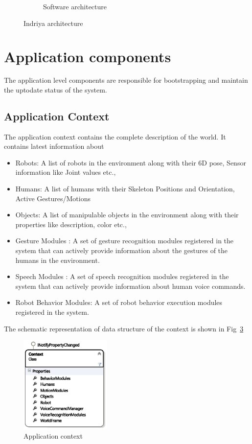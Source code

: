\begin{figure}
\begin{subfigure}[t]{0.44\textwidth}
\caption[Software architecture]{Software architecture}
\label{fig:architecture}
\end{subfigure}
\caption[Indriya architecture]{Indriya architecture}
\label{fig:indriya_arch}
\end{figure}
\section{Application components}
\label{ssec:app_comp}
The application level components are responsible for bootstrapping and maintain the uptodate status of the system. 
\subsection*{Application Context}
The application context contains the complete description of the world. It contains latest information about
\begin{itemize}[leftmargin={1cm},topsep={0pt},itemsep={0pt},partopsep={0pt},parsep={0pt}] 
\item Robots: A list of robots in the environment along with their 6D pose, Sensor information like Joint values etc.,
\item Humans: A list of humans with their Skeleton Positions and Orientation, Active Gestures/Motions
\item Objects: A list of manipulable objects in the environment along with their properties like description, color etc.,
\item Gesture Modules : A set of gesture recognition modules registered in the system that can actively provide information about the gestures of the humans in the environment.
\item Speech Modules : A set of speech recognition modules registered in the system that can actively provide information about human voice commands.
\item Robot Behavior Modules: A set of robot behavior execution modules registered in the system.
\end{itemize}
The schematic representation of data structure of the context is shown in Fig~\ref{fig:system_context}
\begin{figure}
\centering
\includegraphics[width=0.4\textwidth]{assets/context_class.eps}
\caption[Application context]{Application context}
\label{fig:system_context}
\end{figure}
